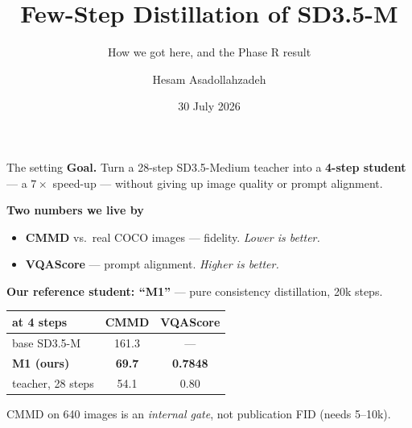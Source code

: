 \documentclass[10pt,aspectratio=169]{beamer}
\title[Phase R]{Few-Step Distillation of SD3.5-M}
\subtitle{How we got here, and the Phase R result}
\author{Hesam Asadollahzadeh}
\date{30 July 2026}
\begin{document}
\begin{frame}[plain]
  \titlepage
\end{frame}

\begin{frame}{The setting}
  \textbf{Goal.} Turn a 28-step SD3.5-Medium teacher into a \textbf{4-step student}
  --- a $7\times$ speed-up --- without giving up image quality or prompt alignment.

  \vspace{1em}
  \textbf{Two numbers we live by}
  \begin{itemize}
    \item \textbf{CMMD} vs.\ real COCO images --- fidelity. \emph{Lower is better.}
    \item \textbf{VQAScore} --- prompt alignment. \emph{Higher is better.}
  \end{itemize}

  \vspace{1em}
  \textbf{Our reference student: ``M1''} --- pure consistency distillation, 20k steps.
  \begin{center}
  \begin{tabular}{lcc}
    \toprule
    at 4 steps & CMMD & VQAScore \\
    \midrule
    base SD3.5-M      & 161.3 & --- \\
    \textbf{M1 (ours)} & \textbf{69.7} & \textbf{0.7848} \\
    teacher, 28 steps & 54.1 & 0.80 \\
    \bottomrule
  \end{tabular}
  \end{center}

  \begin{block}{}
    \small CMMD on 640 images is an \emph{internal gate}, not publication FID (needs 5--10k).
  \end{block}
\end{frame}
\end{document}
